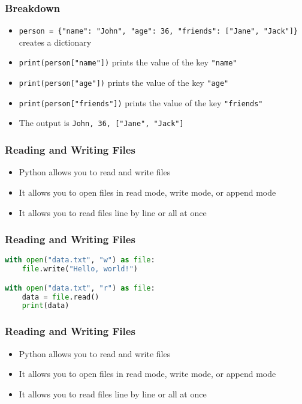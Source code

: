 \documentclass[serif, 9pt, aspectratio=32]{beamer}
\begin{document}
\begin{frame}
    \centering
    \frametitle{Breakdown}
    \begin{itemize}
        \setlength{\itemsep}{2em}
        \item \texttt{person = \{"name": "John", "age": 36, "friends": ["Jane", "Jack"]\}} creates a dictionary
        \item \texttt{print(person["name"])} prints the value of the key \texttt{"name"}
        \item \texttt{print(person["age"])} prints the value of the key \texttt{"age"}
        \item \texttt{print(person["friends"])} prints the value of the key \texttt{"friends"}
        \item The output is \texttt{John, 36, ["Jane", "Jack"]}
    \end{itemize}
\end{frame}

\begin{frame}
    \centering
    \frametitle{Reading and Writing Files}
    \begin{itemize}
        \setlength{\itemsep}{2em}
        \item Python allows you to read and write files
        \item It allows you to open files in read mode, write mode, or append mode
        \item It allows you to read files line by line or all at once
    \end{itemize}
\end{frame}

\begin{frame}[fragile]
    \frametitle{Reading and Writing Files}
    \begin{lstlisting}[language=Python]
with open("data.txt", "w") as file:
    file.write("Hello, world!")

with open("data.txt", "r") as file:
    data = file.read()
    print(data)
    \end{lstlisting}
\end{frame}

\begin{frame}
    \centering
    \frametitle{Reading and Writing Files}
    \begin{itemize}
        \setlength{\itemsep}{2em}
        \item Python allows you to read and write files
        \item It allows you to open files in read mode, write mode, or append mode
        \item It allows you to read files line by line or all at once
    \end{itemize}
\end{frame}
\end{document}

